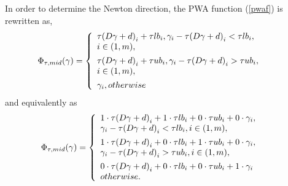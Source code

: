 \documentclass[journal]{IEEEtran}
\begin{document}
In order to determine the Newton direction, the PWA function (\ref{pwaf}) is rewritten as,
\begin{equation}\label{pwacate}
\Phi _{\tau ,mid}(\gamma )=\left\{
\begin{array}{ll}
\tau {{(D\gamma  + d)}_i} + \tau l{b_i},{\gamma _i} - \tau {{(D\gamma  + d)}_i} < \tau l{b_i},\quad &\multirow{2}*{}\\
i \in (1,m),&\\
\specialrule{0em}{0.5ex}{0.5ex}
{\tau {{(D\gamma  + d)}_i} + \tau u{b_i}},{\gamma _i} - \tau {{(D\gamma  + d)}_i} > \tau u{b_i},\quad &\multirow{2}*{}\\
i \in (1,m), &\\
\specialrule{0em}{0.5ex}{0.5ex}
\gamma_i,{otherwise}\quad &\multirow{2}*{}\\
\end{array}\right.
\end{equation}
and equivalently as
\begin{equation}\label{pwacate2}
{\Phi _{\tau ,mid}}(\gamma ) = \left\{ {\begin{array}{*{20}{l}}
	{1 \cdot \tau {{(D\gamma  + d)}_i} + 1 \cdot \tau l{b_i} + 0 \cdot \tau u{b_i} + 0 \cdot {\gamma _i}},\quad &\multirow{2}*{}\\
{{\gamma _i} - \tau {{(D\gamma  + d)}_i} < \tau l{b_i},i \in (1,m)},&\\
\specialrule{0em}{0.5ex}{0.5ex}
	{1 \cdot \tau {{(D\gamma  + d)}_i} + 0 \cdot \tau l{b_i} + 1 \cdot \tau u{b_i} + 0 \cdot {\gamma _i}},\quad &\multirow{2}*{}\\
{{\gamma _i} - \tau {{(D\gamma  + d)}_i} > \tau u{b_i},i \in (1,m)},&\\
\specialrule{0em}{0.5ex}{0.5ex}
	{0 \cdot \tau {{(D\gamma  + d)}_i} + 0 \cdot \tau l{b_i} + 0 \cdot \tau u{b_i} + 1 \cdot {\gamma _i}}\quad &\multirow{2}*{}\\
{otherwise}.&
	\end{array}} \right.
\end{equation}
\end{document}
